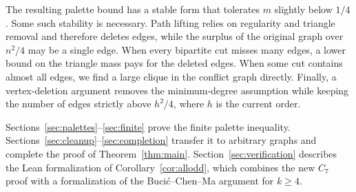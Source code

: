 The resulting palette bound has a stable form that tolerates $m$ slightly below $1/4$. Some such stability is necessary. Path lifting relies on regularity and triangle removal and therefore deletes edges, while the surplus of the original graph over $n^2/4$ may be a single edge. When every bipartite cut misses many edges, a lower bound on the triangle mass pays for the deleted edges. When some cut contains almost all edges, we find a large clique in the conflict graph directly. Finally, a vertex-deletion argument removes the minimum-degree assumption while keeping the number of edges strictly above $h^2/4$, where $h$ is the current order.

Sections~\ref{sec:palettes}--\ref{sec:finite} prove the finite palette inequality. Sections~\ref{sec:cleanup}--\ref{sec:completion} transfer it to arbitrary graphs and complete the proof of Theorem~\ref{thm:main}. Section~\ref{sec:verification} describes the Lean formalization of Corollary~\ref{cor:allodd}, which combines the new $C_7$ proof with a formalization of the Buci\'c--Chen--Ma argument for $k\ge4$.
